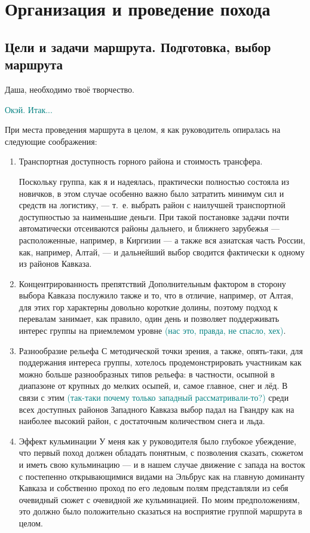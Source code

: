 \section{Организация и проведение похода}
\subsection{Цели и задачи маршрута. Подготовка, выбор маршрута}
Даша, необходимо твоё творчество. 

\textcolor{teal}{Окэй. Итак...} 

При места проведения маршрута в целом, я как руководитель опиралась на следующие соображения: 
\begin{enumerate} 
	\item Транспортная доступность горного района и стоимость трансфера. 

	Поскольку группа, как я и надеялась, практически полностью состояла из новичков, в этом случае особенно важно было затратить минимум сил и средств на логистику, --- т.~е. выбрать район с наилучшей транспортной доступностью за наименьшие деньги. При такой постановке задачи почти автоматически отсеиваются районы дальнего, и ближнего зарубежья --- расположенные, например, в Киргизии --- а также вся азиатская часть России, как, например, Алтай, --- и дальнейший выбор сводится фактически к одному из районов Кавказа. 
	
	\item Концентрированность препятствий 
	Дополнительным фактором в сторону выбора Кавказа послужило также и то, что в отличие, например, от Алтая, для этих гор характерны довольно короткие долины, поэтому подход к перевалам занимает, как правило, один день и позволяет поддерживать интерес группы на приемлемом уровне \textcolor{teal}{(нас это, правда, не спасло, хех)}. 
	
	\item Разнообразие рельефа  
	С методической точки зрения, а также, опять-таки, для поддержания интереса группы, хотелось продемонстрировать участникам как можно больше разнообразных типов рельефа: в частности, осыпной в диапазоне от крупных до мелких осыпей, и, самое главное, снег и лёд. В связи с этим \textcolor{teal}{(так-таки почему только западный рассматривали-то?)} среди всех доступных районов Западного Кавказа выбор падал на Гвандру как на наиболее высокий район, с достаточным количеством снега и льда. 
	
	\item Эффект кульминации 
	У меня как у руководителя было глубокое убеждение, что первый поход должен обладать понятным, с позволения сказать, сюжетом и иметь свою кульминацию — и в нашем случае движение с запада на восток с постепенно открывающимися видами на Эльбрус как на главную доминанту Кавказа и собственно проход по его ледовым полям представляли из себя очевидный сюжет с очевидной же кульминацией. По моим предположениям, это должно было положительно сказаться на восприятие группой  маршрута в целом. 
	

\end{enumerate}
